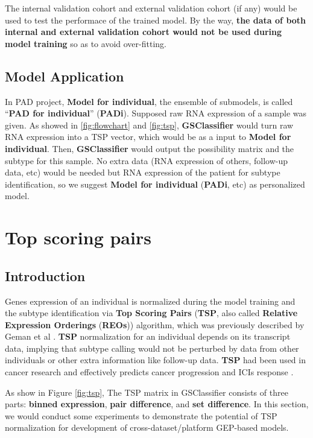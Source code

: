 \documentclass[
  12pt,
]{book}
\begin{document}
The internal validation cohort and external validation cohort (if any) would be used to test the performace of the trained model. By the way, \textbf{the data of both internal and external validation cohort would not be used during model training} so as to avoid over-fitting.

\hypertarget{model-application}{%
\subsection{Model Application}\label{model-application}}

In PAD project, \textbf{Model for individual}, the ensemble of submodels, is called ``\textbf{PAD for individual}'' (\textbf{PADi}). Supposed raw RNA expression of a sample was given. As showed in \ref{fig:flowchart} and \ref{fig:tsp}, \textbf{GSClassifier} would turn raw RNA expression into a TSP vector, which would be as a input to \textbf{Model for individual}. Then, \textbf{GSClassifier} would output the possibility matrix and the subtype for this sample. No extra data (RNA expression of others, follow-up data, etc) would be needed but RNA expression of the patient for subtype identification, so we suggest \textbf{Model for individual} (\textbf{PADi}, etc) as personalized model.

\hypertarget{topicTSP}{%
\section{Top scoring pairs}\label{topicTSP}}

\hypertarget{tsp-intro}{%
\subsection{Introduction}\label{tsp-intro}}

Genes expression of an individual is normalized during the model training and the subtype identification via \textbf{Top Scoring Pairs} (\textbf{TSP}, also called \textbf{Relative Expression Orderings} (\textbf{REOs})) algorithm, which was previously described by Geman et al \citep{RN267}. \textbf{TSP} normalization for an individual depends on its transcript data, implying that subtype calling would not be perturbed by data from other individuals or other extra information like follow-up data. \textbf{TSP} had been used in cancer research and effectively predicts cancer progression and ICIs response \citep{RN265, RN266, RN261}.

As show in Figure \ref{fig:tsp}, The TSP matrix in GSClassifier consists of three parts: \textbf{binned expression}, \textbf{pair difference}, and \textbf{set difference}. In this section, we would conduct some experiments to demonstrate the potential of TSP normalization for development of cross-dataset/platform GEP-based models.
\end{document}
